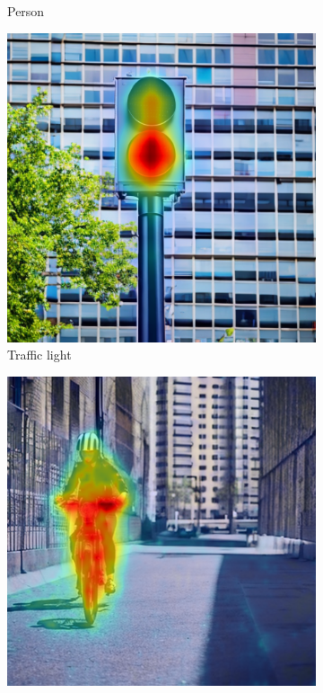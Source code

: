 \begin{figure}
\begin{subfigure}{0.24\columnwidth}
   \caption{Person}
   \label{subfig:dataset-example-person-daam}
  \end{subfigure}
  \begin{subfigure}{0.24\columnwidth}
   \includegraphics[width=\columnwidth]{img/4-experiments/dataset_example_daam_heatmap_traffic light.png}
   \caption{Traffic light}
   \label{subfig:dataset-example-traffic-daam}
  \end{subfigure}
  \begin{subfigure}{0.24\columnwidth}
   \includegraphics[width=\columnwidth]{img/4-experiments/dataset_example_daam_heatmap_rider.png}

\end{subfigure}
\end{figure}
